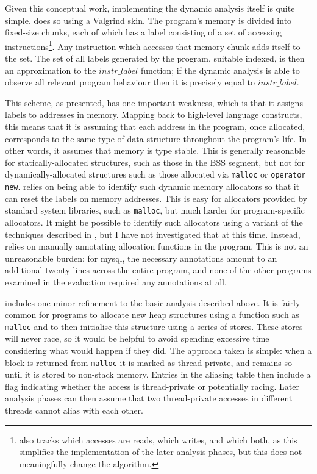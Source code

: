 Given this conceptual work, implementing the dynamic analysis itself
is quite simple.  {\Implementation} does so using a Valgrind
skin\needCite{}.  The program's memory is divided into fixed-size
chunks, each of which has a label consisting of a set of accessing
instructions\footnote{{\Implementation} also tracks which accesses are
  reads, which writes, and which both, as this simplifies the
  implementation of the later analysis phases, but this does not
  meaningfully change the algorithm.}.  Any instruction which accesses
that memory chunk adds itself to the set.  The set of all labels
generated by the program, suitable indexed, is then an approximation
to the $\mathit{instr\_label}$ function; if the dynamic analysis is
able to observe all relevant program behaviour then it is precisely
equal to $\mathit{instr\_label}$.

This scheme, as presented, has one important weakness, which is that
it assigns labels to addresses in memory.  Mapping back to high-level
language constructs, this means that it is assuming that each address
in the program, once allocated, corresponds to the same type of data
structure throughout the program's life.  In other words, it assumes
that memory is type stable\needCite{}.  This is generally reasonable
for statically-allocated structures, such as those in the BSS
segment\needCite{}, but not for dynamically-allocated structures such
as those allocated via \texttt{malloc} or \texttt{operator new}.
{\Implementation} relies on being able to identify such dynamic memory
allocators so that it can reset the labels on memory addresses.  This
is easy for allocators provided by standard system libraries, such as
\texttt{malloc}, but much harder for program-specific allocators.  It
might be possible to identify such allocators using a variant of the
techniques described in , but I have not investigated that at this time.
Instead, {\implementation} relies on manually annotating allocation
functions in the program.  This is not an unreasonable burden: for
mysql, the necessary annotations amount to an additional twenty lines
across the entire program, and none of the other programs examined in
the evaluation required any annotations at all.

{\Implementation} includes one minor refinement to the basic analysis
described above.  It is fairly common for programs to allocate new
heap structures using a function such as \texttt{malloc} and to then
initialise this structure using a series of stores.  These stores will
never race, so it would be helpful to avoid spending excessive time
considering what would happen if they did.  The approach taken is
simple: when a block is returned from \texttt{malloc} it is marked as
thread-private, and remains so until it is stored to non-stack memory.
Entries in the aliasing table then include a flag indicating whether
the access is thread-private or potentially racing.  Later analysis
phases can then assume that two thread-private accesses in different
threads cannot alias with each other.

